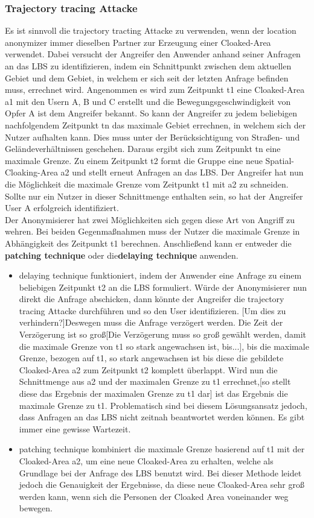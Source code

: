 \subsubsection{Trajectory tracing Attacke} 
Es ist sinnvoll die trajectory tracting Attacke zu verwenden, wenn der location anonymizer immer dieselben Partner zur Erzeugung einer Cloaked-Area verwendet. Dabei versucht der Angreifer den Anwender anhand seiner Anfragen an das LBS zu identifizieren, indem ein Schnittpunkt zwischen dem aktuellen Gebiet und dem Gebiet, in welchem er sich seit der letzten Anfrage befinden muss, errechnet wird. Angenommen es wird zum Zeitpunkt t1 eine Cloaked-Area a1 mit den Usern A, B und C erstellt und die Bewegungsgeschwindigkeit von Opfer A ist dem Angreifer bekannt. So kann der Angreifer zu jedem beliebigen nachfolgendem Zeitpunkt tn das maximale Gebiet errechnen, in welchem sich der Nutzer aufhalten kann. Dies muss unter der Berücksichtigung von Straßen- und Geländeverhältnissen geschehen. Daraus ergibt sich zum Zeitpunkt tn eine maximale Grenze. Zu einem Zeitpunkt t2 formt die Gruppe eine neue Spatial-Cloaking-Area a2 und stellt erneut Anfragen an das LBS. Der Angreifer hat nun die Möglichkeit die maximale Grenze vom Zeitpunkt t1 mit a2 zu schneiden. Sollte nur ein Nutzer in dieser Schnittmenge enthalten sein, so hat der Angreifer User A erfolgreich identifiziert.\\  Der Anonymisierer hat zwei Möglichkeiten sich gegen diese Art von Angriff zu wehren. Bei beiden Gegenmaßnahmen muss der Nutzer die maximale Grenze in Abhängigkeit des Zeitpunkt t1 berechnen. Anschließend kann er entweder die \textbf{patching technique} oder die\textbf{delaying technique} anwenden. 
\begin{itemize} 
\item{delaying technique} funktioniert, indem der Anwender eine Anfrage zu einem beliebigen Zeitpunkt t2 an die LBS formuliert. Würde der Anonymisierer nun direkt die Anfrage abschicken, dann könnte der Angreifer die trajectory tracing Attacke durchführen und so den User identifizieren. [Um dies zu verhindern?]Deswegen muss die Anfrage verzögert werden. Die Zeit der Verzögerung ist so groß[Die Verzögerung muss so groß gewählt werden, damit die maximale Grenze von t1 so stark angewachsen ist, bis...], bis die maximale Grenze, bezogen auf t1, so stark angewachsen ist bis diese die gebildete Cloaked-Area a2 zum Zeitpunkt t2 komplett überlappt. Wird nun die Schnittmenge aus a2 und der maximalen Grenze zu t1 errechnet,[so stellt diese das Ergebnis der maximalen Grenze zu t1 dar] ist das Ergebnis die maximale Grenze zu t1. Problematisch sind bei diesem Lösungsansatz jedoch, dass Anfragen an das LBS nicht zeitnah beantwortet werden können. Es gibt immer eine gewisse Wartezeit. \item{patching technique} kombiniert die maximale Grenze basierend auf t1 mit der Cloaked-Area a2, um eine neue Cloaked-Area zu erhalten, welche als Grundlage bei der Anfrage des LBS benutzt wird. Bei dieser Methode leidet jedoch die Genauigkeit der Ergebnisse, da diese neue Cloaked-Area sehr groß werden kann, wenn sich die Personen der Cloaked Area voneinander weg bewegen.  
\end{itemize} 

